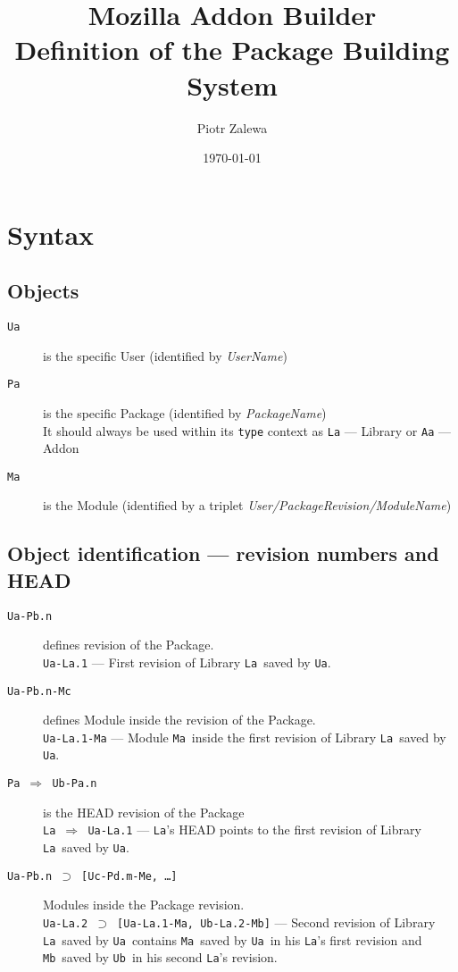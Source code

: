 \documentclass[10pt]{article}
\title{Mozilla Addon Builder\\ Definition of the Package Building System}
\author{Piotr Zalewa}
\date{\today}
\def\Ua{{\tt Ua}}
\def\Ub{{\tt Ub}}
\def\La{{\tt La}}
\def\Ma{{\tt Ma}}
\def\Mb{{\tt Mb}}
\def\headsto{${\Longrightarrow}$ }
\def\hto{\headsto}
\def\eq{${\supset}$ }
\begin{document}
\maketitle

\section{Syntax}

	\subsection{Objects}
	\begin{description}
		\item[{\tt Ua}] is the specific User (identified by {\em UserName})
		\item[{\tt Pa}] is the specific Package (identified by {\em PackageName})\\
			It should always be used within its {\tt type} context as {\tt La} --- Library or {\tt Aa} --- Addon
		\item[{\tt Ma}] is the Module (identified by a triplet {\em User/PackageRevision/ModuleName})
	\end{description}

	\subsection{Object identification --- revision numbers and HEAD}
	\begin{description}
		\item[{\tt Ua-Pb.n}] defines revision of the Package.\\ 
			{\tt Ua-La.1} --- First revision of Library \La\ saved by \Ua.
		\item[{\tt Ua-Pb.n-Mc}] defines Module inside the revision of the Package. \\ 
			{\tt Ua-La.1-Ma} --- Module \Ma\ inside the first revision of Library \La\ saved by \Ua.
		\item[{\tt Pa \hto  Ub-Pa.n}] is the HEAD revision of the Package\\ 
			{\tt La \hto  Ua-La.1} --- \La's HEAD points to the first revision of Library \La\ saved by \Ua.
		\item[{\tt Ua-Pb.n \eq [Uc-Pd.m-Me, \ldots]}] Modules inside the Package revision.\\ 
			{\tt Ua-La.2 \eq [Ua-La.1-Ma, Ub-La.2-Mb]} --- Second revision of Library \La\ saved by \Ua\ contains \Ma\ saved by \Ua\ in his \La's first revision and \Mb\ saved by \Ub\ in his second \La's revision.
	\end{description}
\end{document}
